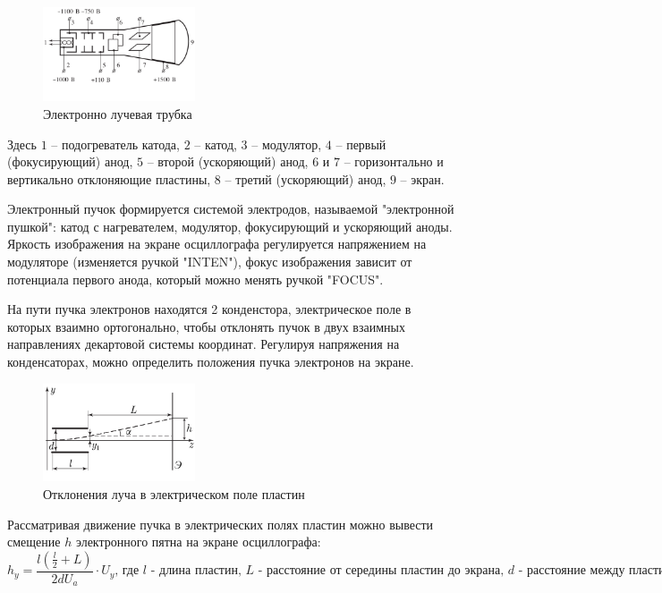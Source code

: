 \documentclass[a4paper]{article}
\begin{document}
\begin{figure}
\centering
\includegraphics[width=0.4\textwidth]{1.png}
\caption{Электронно лучевая трубка}
\end{figure}

Здесь $1$ -- подогреватель катода, $2$ -- катод, $3$ -- модулятор, $4$ -- первый (фокусирующий)
анод, $5$ -- второй (ускоряющий) анод, $6$ и $7$ -- горизонтально и вертикально отклоняющие
пластины, $8$ -- третий (ускоряющий) анод, $9$ -- экран.

Электронный пучок формируется системой электродов, называемой "электронной пушкой": катод с нагревателем, модулятор, фокусирующий и ускоряющий аноды. Яркость изображения на экране осциллографа регулируется напряжением на модуляторе (изменяется ручкой "INTEN"), фокус изображения зависит от потенциала первого анода, который можно менять ручкой "FOCUS".

На пути пучка электронов находятся 2 конденстора, электрическое поле в которых взаимно ортогонально, чтобы отклонять пучок в двух взаимных направлениях декартовой системы координат. Регулируя напряжения на конденсаторах, можно определить положения пучка электронов на экране.

\begin{figure}[t]
    \centering
    \includegraphics[width=0.4\textwidth]{2.png}
    \caption{Отклонения луча в электрическом поле пластин}
\end{figure}

Рассматривая движение пучка в электрических полях пластин можно вывести смещение $h$ электронного пятна на экране осциллографа: 
\[h_{y} =\frac{l(\frac{l}{2} + L)}{2dU_{a}}\cdot U_y \text{,  где $l$ - длина пластин, $L$ - расстояние от середины пластин до экрана, $d$ - расстояние между пластинами, $U_{a}$ - ускоряющее напряжение на втором аноде, $U_{y}$ - напряжение между пластинами.}\]
\end{document}
